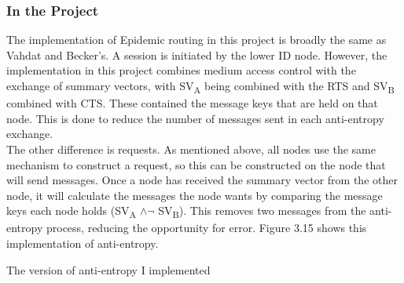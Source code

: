 \documentclass[12pt,a4paper]{report}
\makeatletter
\newenvironment{figurehere}
  {\def\@captype{figure}}
  {}
\makeatother
\begin{document}
\subsubsection{In the Project}
The implementation of Epidemic routing in this project is broadly the same as Vahdat and Becker's. A session is initiated by the lower ID node. However, the implementation in this project combines medium access control with the exchange of summary vectors, with SV\textsubscript{A} being combined with the RTS and SV\textsubscript{B} combined with CTS. These contained the message keys that are held on that node. This is done to reduce the number of messages sent in each anti-entropy exchange. \\
The other difference is requests. As mentioned above, all nodes use the same mechanism to construct a request, so this can be constructed on the node that will send messages. Once a node has received the summary vector from the other node, it will calculate the messages the node wants by comparing the message keys each node holds (SV\textsubscript{A} $\wedge \neg$ SV\textsubscript{B}). This removes two messages from the anti-entropy process, reducing the opportunity for error. Figure 3.15 shows this implementation of anti-entropy.

\begin{figurehere} 
\begin{center}
\end{center}
\caption{The version of anti-entropy I implemented}
\end{figurehere} 
\bigskip
\end{document}
